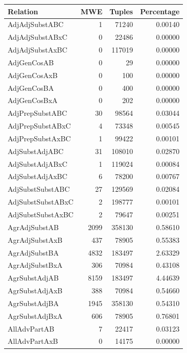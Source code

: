 \begin{table}[t]
    \centering
    \scriptsize
    \begin{tabular}{|l|r|r|r|}
        \hline 
        \textbf{Relation} & \textbf{MWE} & \textbf{Tuples} & \textbf{Percentage} \\
        \hline
        AdjAdjSubstABC & 1 & 71240 & 0.00140 \\
        AdjAdjSubstABxC & 0 & 22486 & 0.00000 \\
        AdjAdjSubstAxBC & 0 & 117019 & 0.00000 \\
        AdjGenCosAB & 0 & 29 & 0.00000 \\
        AdjGenCosAxB & 0 & 100 & 0.00000 \\
        AdjGenCosBA & 0 & 400 & 0.00000 \\
        AdjGenCosBxA & 0 & 202 & 0.00000 \\
        AdjPrepSubstABC & 30 & 98564 & 0.03044 \\
        AdjPrepSubstABxC & 4 & 73348 & 0.00545 \\
        AdjPrepSubstAxBC & 1 & 99422 & 0.00101 \\
        AdjSubstAdjABC & 31 & 108010 & 0.02870 \\
        AdjSubstAdjABxC & 1 & 119024 & 0.00084 \\
        AdjSubstAdjAxBC & 6 & 78200 & 0.00767 \\
        AdjSubstSubstABC & 27 & 129569 & 0.02084 \\
        AdjSubstSubstABxC & 2 & 198777 & 0.00101 \\
        AdjSubstSubstAxBC & 2 & 79647 & 0.00251 \\
        AgrAdjSubstAB & 2099 & 358130 & 0.58610 \\
        AgrAdjSubstAxB & 437 & 78905 & 0.55383 \\
        AgrAdjSubstBA & 4832 & 183497 & 2.63329 \\
        AgrAdjSubstBxA & 306 & 70984 & 0.43108 \\
        AgrSubstAdjAB & 8159 & 183497 & 4.44639 \\
        AgrSubstAdjAxB & 388 & 70984 & 0.54660 \\
        AgrSubstAdjBA & 1945 & 358130 & 0.54310 \\
        AgrSubstAdjBxA & 606 & 78905 & 0.76801 \\
        AllAdvPartAB & 7 & 22417 & 0.03123 \\
        AllAdvPartAxB & 0 & 14175 & 0.00000 \\

\end{tabular}
\end{table}
